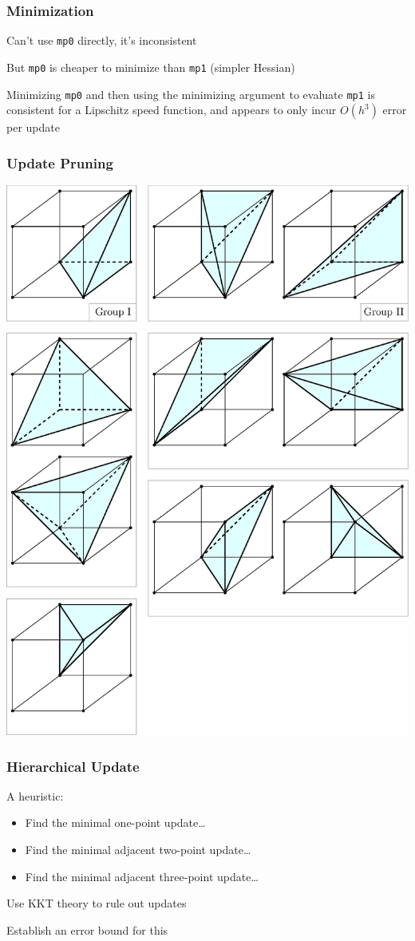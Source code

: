 \documentclass{beamer}
\begin{document}
\begin{frame}
  \frametitle{Minimization}

  Can't use \texttt{mp0} directly, it's inconsistent

  \vspace{1em}

  But \texttt{mp0} is cheaper to minimize than \texttt{mp1} (simpler
  Hessian)

  \vspace{1em}

  Minimizing \texttt{mp0} and then using the minimizing argument to
  evaluate \texttt{mp1} is consistent for a Lipschitz speed function,
  and appears to only incur $O(h^3)$ error per update
\end{frame}

\begin{frame}
  \frametitle{Update Pruning}

  \begin{center}
    \includegraphics[width=0.56\linewidth]{tetra-by-group.eps}
  \end{center}
\end{frame}

\begin{frame}
  \frametitle{Hierarchical Update}

  A heuristic:
  \begin{itemize}
  \item Find the minimal one-point update\ldots
  \item Find the minimal adjacent two-point update\ldots
  \item Find the minimal adjacent three-point update\dots
  \end{itemize}
  
  \vspace{1em}

  Use KKT theory to rule out updates

  \vspace{1em}

  Establish an error bound for this
\end{frame}
\end{document}
